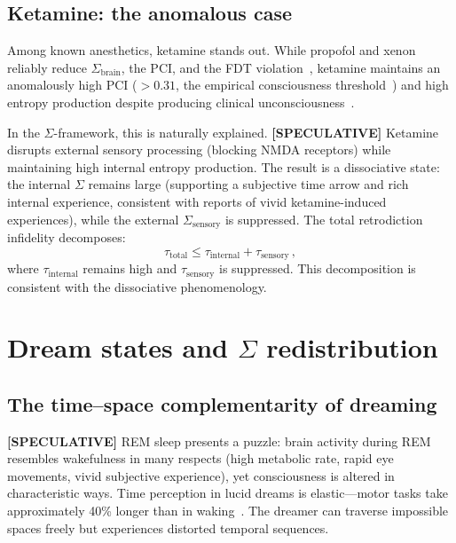 \documentclass[prl,twocolumn,superscriptaddress,longbibliography,floatfix]{revtex4-2}
\newcommand{\tauasym}{\tau}
\newcommand{\Sbrain}{\Sigma_{\mathrm{brain}}}
\begin{document}
\subsection{Ketamine: the anomalous case}
\label{subsec:ketamine}

Among known anesthetics, ketamine stands out.  While propofol and
xenon reliably reduce $\Sbrain$, the PCI, and the FDT
violation~\cite{PRR2025}, ketamine maintains an anomalously high
PCI ($>0.31$, the empirical consciousness
threshold~\cite{Casali2013}) and high entropy production despite
producing clinical unconsciousness~\cite{SanzPerl2021}.

In the $\Sigma$-framework, this is naturally explained.
\textbf{[SPECULATIVE]}  Ketamine disrupts external sensory
processing (blocking NMDA receptors) while maintaining high internal
entropy production.  The result is a dissociative state: the
internal $\Sigma$ remains large (supporting a subjective time
arrow and rich internal experience, consistent with reports of
vivid ketamine-induced experiences), while the external
$\Sigma_{\mathrm{sensory}}$ is suppressed.  The total retrodiction
infidelity decomposes:
\begin{equation}
\tauasym_{\mathrm{total}} \leq
  \tauasym_{\mathrm{internal}} + \tauasym_{\mathrm{sensory}}\,,
\end{equation}
where $\tauasym_{\mathrm{internal}}$ remains high and
$\tauasym_{\mathrm{sensory}}$ is suppressed.  This decomposition
is consistent with the dissociative phenomenology.


\section{Dream states and $\Sigma$ redistribution}
\label{sec:dreams}

\subsection{The time--space complementarity of dreaming}
\label{subsec:time_space}

\textbf{[SPECULATIVE]}
REM sleep presents a puzzle: brain activity during REM resembles
wakefulness in many respects (high metabolic rate, rapid eye
movements, vivid subjective experience), yet consciousness is
altered in characteristic ways.  Time perception in lucid dreams is
elastic---motor tasks take approximately 40\% longer than in
waking~\cite{Erlacher2014}.  The dreamer can traverse impossible
spaces freely but experiences distorted temporal sequences.
\end{document}
